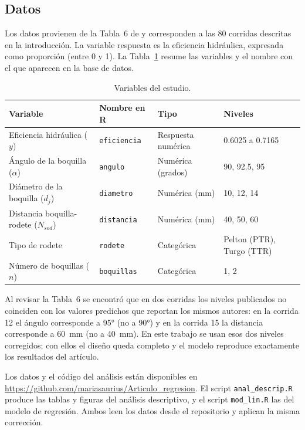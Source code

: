 
\subsection{Datos}
\label{sec:datos}

Los datos provienen de la Tabla~6 de \citet{Lakdawala2025} y corresponden a las 80 corridas descritas en la introducción. La variable respuesta es la eficiencia hidráulica, expresada como proporción (entre 0 y 1). La Tabla~\ref{tab:variables} resume las variables y el nombre con el que aparecen en la base de datos.

\begin{table}[ht]
\centering
\caption{Variables del estudio.}
\label{tab:variables}
\begin{tabular}{llll}
\toprule
Variable & Nombre en R & Tipo & Niveles \\
\midrule
Eficiencia hidráulica ($y$)            & \texttt{eficiencia} & Respuesta numérica   & 0.6025 a 0.7165 \\
Ángulo de la boquilla ($\alpha$)       & \texttt{angulo}     & Numérica (grados)    & 90, 92.5, 95 \\
Diámetro de la boquilla ($d_j$)        & \texttt{diametro}   & Numérica (mm)        & 10, 12, 14 \\
Distancia boquilla-rodete ($N_{sod}$)  & \texttt{distancia}  & Numérica (mm)        & 40, 50, 60 \\
Tipo de rodete                         & \texttt{rodete}     & Categórica           & Pelton (PTR), Turgo (TTR) \\
Número de boquillas ($n$)              & \texttt{boquillas}  & Categórica           & 1, 2 \\
\bottomrule
\end{tabular}
\end{table}

Al revisar la Tabla~6 se encontró que en dos corridas los niveles publicados no coinciden con los valores predichos que reportan los mismos autores: en la corrida 12 el ángulo corresponde a 95° (no a 90°) y en la corrida 15 la distancia corresponde a 60~mm (no a 40~mm). En este trabajo se usan esos dos niveles corregidos; con ellos el diseño queda completo y el modelo reproduce exactamente los resultados del artículo.

Los datos y el código del análisis están disponibles en \url{https://github.com/mariasaurius/Articulo_regresion}. El script \texttt{anal\_descrip.R} produce las tablas y figuras del análisis descriptivo, y el script \texttt{mod\_lin.R} las del modelo de regresión. Ambos leen los datos desde el repositorio y aplican la misma corrección.

